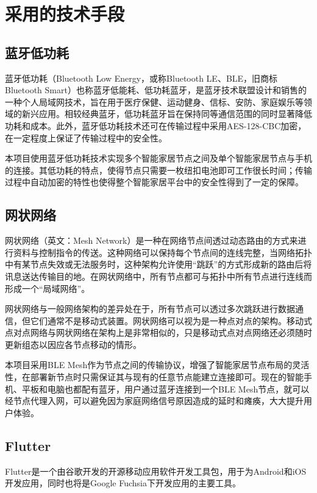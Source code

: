 \chapter{采用的技术手段}

\section{蓝牙低功耗}
蓝牙低功耗（Bluetooth Low Energy，或称Bluetooth LE、BLE，旧商标Bluetooth Smart）也称蓝牙低能耗、低功耗蓝牙，是蓝牙技术联盟设计和销售的一种个人局域网技术，旨在用于医疗保健、运动健身、信标、安防、家庭娱乐等领域的新兴应用。相较经典蓝牙，低功耗蓝牙旨在保持同等通信范围的同时显著降低功耗和成本。\cite{ble}此外，蓝牙低功耗技术还可在传输过程中采用AES-128-CBC加密，在一定程度上保证了传输过程中的安全性。

本项目使用蓝牙低功耗技术实现多个智能家居节点之间及单个智能家居节点与手机的连接。其低功耗的特点，使得节点只需要一枚纽扣电池即可工作很长时间；传输过程中自动加密的特性也使得整个智能家居平台中的安全性得到了一定的保障。

\section{网状网络}
网状网络（英文：Mesh Network）是一种在网络节点间透过动态路由的方式来进行资料与控制指令的传送。这种网络可以保持每个节点间的连线完整，当网络拓扑中有某节点失效或无法服务时，这种架构允许使用“跳跃”的方式形成新的路由后将讯息送达传输目的地。在网状网络中，所有节点都可与拓扑中所有节点进行连线而形成一个“局域网络”。

网状网络与一般网络架构的差异处在于，所有节点可以透过多次跳跃进行数据通信，但它们通常不是移动式装置。网状网络可以视为是一种点对点的架构。移动式点对点网络与网状网络在架构上是非常相似的，只是移动式点对点网络还必须随时更新组态以因应各节点移动的情形。\cite{mesh}

本项目采用BLE Mesh作为节点之间的传输协议，增强了智能家居节点布局的灵活性，在部署新节点时只需保证其与现有的任意节点能建立连接即可。现在的智能手机、平板和电脑也都配有蓝牙，用户通过蓝牙连接到一个BLE Mesh节点，就可以经节点代理入网，可以避免因为家庭网络信号原因造成的延时和瘫痪，大大提升用户体验。\cite{bleinfo}

\section{Flutter}
Flutter是一个由谷歌开发的开源移动应用软件开发工具包，用于为Android和iOS开发应用，同时也将是Google Fuchsia下开发应用的主要工具。\cite{flutter}

